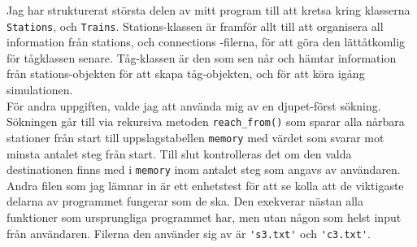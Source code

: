 \documentclass{article}
\begin{document}
\noindent Jag har strukturerat största delen av mitt program till att kretsa kring klasserna \verb|Stations|, och \verb|Trains|. Stations-klassen är framför allt till att organisera all information från stations, och connections -filerna, för att göra den lättåtkomlig för tågklassen senare. Tåg-klassen är den som sen når och hämtar information från stations-objekten för att skapa tåg-objekten, och för att köra igång simulationen.
\\

\noindent För andra uppgiften, valde jag att använda mig av en djupet-först sökning. Sökningen går till via rekursiva metoden \verb|reach_from()| som sparar alla nårbara stationer från start till uppslagstabellen \verb|memory| med värdet som svarar mot minsta antalet steg från start. Till slut kontrolleras det om den valda destinationen finns med i \verb|memory| inom antalet steg som angavs av användaren.
\\

\noindent Andra filen som jag lämnar in är ett enhetstest för att se kolla att de viktigaste delarna av programmet fungerar som de ska. Den exekverar nästan alla funktioner som ursprungliga programmet har, men utan någon som helst input från användaren. Filerna den använder sig av är \verb|'s3.txt'| och \verb|'c3.txt'|.
\\
\end{document}
